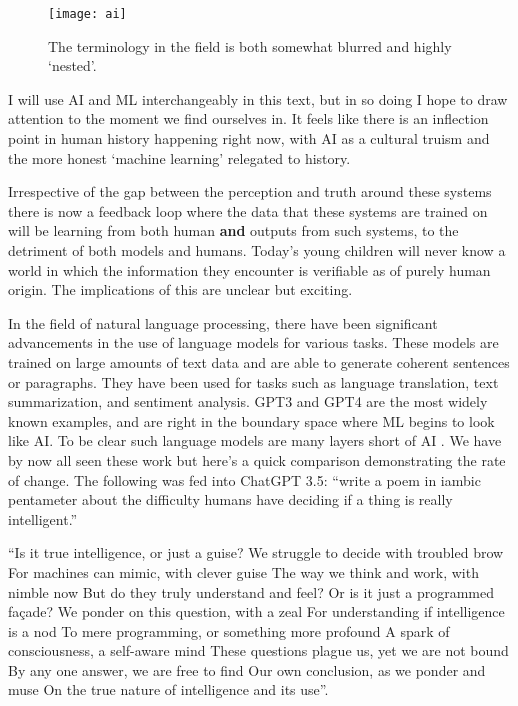 \begin{figure}[ht]\centering 	\texttt{[image: ai]}
	\caption{The terminology in the field is both somewhat blurred and highly `nested'.}
	\label{fig:aiVenn}
\end{figure}

I will use AI and ML interchangeably in this text, but in so doing I hope to draw attention to the moment we find ourselves in. It feels like there is an inflection point in human history happening right now, with AI as a cultural truism and the more honest `machine learning' relegated to history. \par
Irrespective of the gap between the perception and truth around these systems there is now a feedback loop where the data that these systems are trained on will be learning from both human \textbf{and} outputs from such systems, to the detriment of both models and humans\cite{shumailov2023curse}. Today's young children will never know a world in which the information they encounter is verifiable as of purely human origin. The implications of this are unclear but exciting. \par
In the field of natural language processing, there have been significant advancements in the use of language models for various tasks. These models are trained on large amounts of text data and are able to generate coherent sentences or paragraphs. They have been used for tasks such as language translation, text summarization, and sentiment analysis. GPT3 and GPT4 are the most widely known examples, and are right in the boundary space where ML begins to look like AI. To be clear such language models are many layers short of AI \cite{elkins2020can, marcus2020gpt}. We have by now all seen these work but here's a quick comparison demonstrating the rate of change. The following was fed into ChatGPT 3.5: ``write a poem in iambic pentameter about the difficulty humans have deciding if a thing is really intelligent.''
\newpage
\begin{tcolorbox}[enhanced, frame style={fill=lightgray}, interior style={fill=lightgray}]``Is it true intelligence, or just a guise?
We struggle to decide with troubled brow
For machines can mimic, with clever guise
The way we think and work, with nimble now
But do they truly understand and feel?
Or is it just a programmed façade?
We ponder on this question, with a zeal
For understanding if intelligence is a nod
To mere programming, or something more profound
A spark of consciousness, a self-aware mind
These questions plague us, yet we are not bound
By any one answer, we are free to find
Our own conclusion, as we ponder and muse
On the true nature of intelligence and its use''.
\end{tcolorbox}

